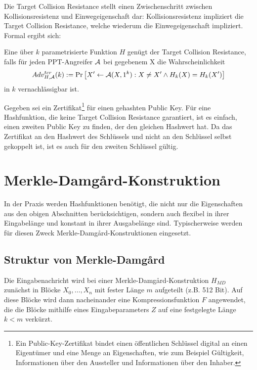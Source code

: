 Die Target Collision Resistance stellt einen Zwischenschritt zwischen Kollisionsresistenz und Einwegeigenschaft dar: Kollisionsresistenz impliziert die
Target Collision Resistance, welche wiederum die Einwegeigenschaft impliziert. Formal ergibt sich:\\

\begin{definition}
Eine über $k$ parametrisierte Funktion $H$ genügt der Target Collision Resistance, falls für jeden PPT-Angreifer $\mathcal{A}$ bei gegebenem X die Wahrscheinlichkeit
\begin{equation*}
Adv^{tcr}_{H,\mathcal{A}}(k):= \Pr \left[ X' \leftarrow \mathcal{A}(X, 1^k) : X \neq X' \land H_k(X) = H_k(X')\right]
\end{equation*}
in $k$ vernachlässigbar ist.
\end{definition}

\begin{beispiel}
Gegeben sei ein Zertifikat\footnote{Ein Public-Key-Zertifikat bindet einen öffentlichen Schlüssel digital an einen Eigentümer und eine Menge an Eigenschaften, wie
zum Beispiel Gültigkeit, Informationen über den Aussteller und Informationen über den Inhaber.} für einen  gehashten Public Key. Für eine Hashfunktion,
die keine Target Collision Resistance garantiert, ist es einfach, einen zweiten Public Key zu finden, der den gleichen Hashwert hat. Da das Zertifikat an den
Hashwert des Schlüssels und nicht an den Schlüssel selbst gekoppelt ist, ist es auch für den zweiten Schlüssel gültig.
\end{beispiel}

\section{Merkle-Damgård-Konstruktion}
\label{ch:hash:merkledamgard}
In der Praxis werden Hashfunktionen benötigt, die nicht nur die Eigenschaften aus den obigen Abschnitten berücksichtigen, sondern auch flexibel in ihrer
Eingabelänge und konstant in ihrer Ausgabelänge sind. Typischerweise werden für diesen Zweck Merkle-Damgård-Konstruktionen eingesetzt. 

\subsection{Struktur von Merkle-Damgård}
Die Eingabenachricht wird bei einer Merkle-Damgård-Konstruktion $H_{MD}$ zunächst in Blöcke $X_0, \ldots , X_n$ mit fester Länge $m$ aufgeteilt (z.B. 512 Bit).
Auf diese Blöcke wird dann nacheinander eine Kompressionsfunktion $F$ angewendet, die die Blöcke mithilfe eines Eingabeparameters $Z$ auf eine festgelegte Länge
$k < m$ verkürzt.


